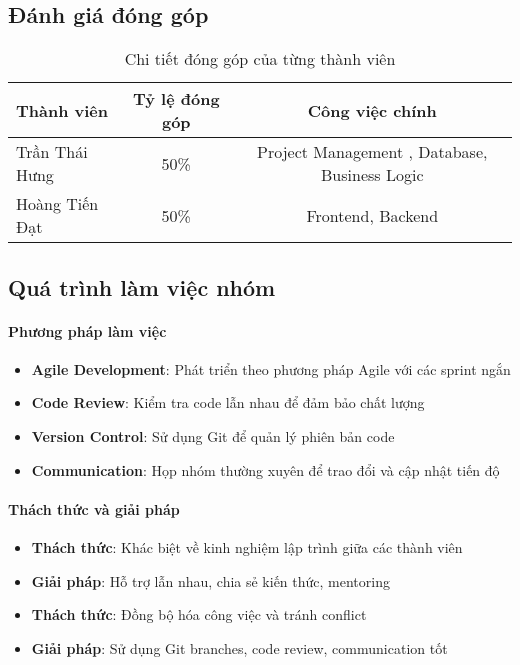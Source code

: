 \documentclass[12pt,a4paper]{article}
\begin{document}
 \subsection{Đánh giá đóng góp}

 \begin{table}[H]
 \centering
 \caption{Chi tiết đóng góp của từng thành viên}
 \label{tab:contribution_details}
 \begin{tabular}{|l|c|c|}
 \hline
 \textbf{Thành viên} & \textbf{Tỷ lệ đóng góp} & \textbf{Công việc chính} \\
 \hline
 Trần Thái Hưng & 50\% & Project Management , Database, Business Logic \\
 \hline
 Hoàng Tiến Đạt & 50\% & Frontend, Backend\\
 \hline
 \end{tabular}
 \end{table}

 \subsection{Quá trình làm việc nhóm}

 \paragraph{Phương pháp làm việc}
 \begin{itemize}
     \item \textbf{Agile Development}: Phát triển theo phương pháp Agile với các sprint ngắn
     \item \textbf{Code Review}: Kiểm tra code lẫn nhau để đảm bảo chất lượng
     \item \textbf{Version Control}: Sử dụng Git để quản lý phiên bản code
     \item \textbf{Communication}: Họp nhóm thường xuyên để trao đổi và cập nhật tiến độ
 \end{itemize}

 \paragraph{Thách thức và giải pháp}
 \begin{itemize}
     \item \textbf{Thách thức}: Khác biệt về kinh nghiệm lập trình giữa các thành viên
     \item \textbf{Giải pháp}: Hỗ trợ lẫn nhau, chia sẻ kiến thức, mentoring
     \item \textbf{Thách thức}: Đồng bộ hóa công việc và tránh conflict
     \item \textbf{Giải pháp}: Sử dụng Git branches, code review, communication tốt
 \end{itemize}
\end{document}
